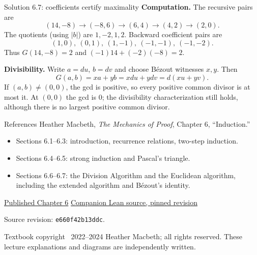 \begin{frame}{Solution 6.7: coefficients certify maximality}
\textbf{Computation.} The recursive pairs are
\[
 (14,-8)\to(-8,6)\to(6,4)\to(4,2)\to(2,0).
\]
The quotients (using $|b|$) are $1,-2,1,2$.
Backward coefficient pairs are
\[
 (1,0),\ (0,1),\ (1,-1),\ (-1,-1),\ (-1,-2).
\]
Thus $G(14,-8)=2$ and $(-1)14+(-2)(-8)=2$.

\textbf{Divisibility.} Write $a=du$, $b=dv$ and choose B\'ezout witnesses $x,y$.
Then
\[
 G(a,b)=xa+yb=xdu+ydv=d(xu+yv).
\]
If $(a,b)\ne(0,0)$, the gcd is positive, so every positive common divisor
is at most it. At $(0,0)$ the gcd is $0$; the divisibility characterization
still holds, although there is no largest positive common divisor.
\end{frame}

\begin{frame}{References}
Heather Macbeth, \emph{The Mechanics of Proof}, Chapter 6, ``Induction.''
\begin{itemize}
\item Sections 6.1--6.3: introduction, recurrence relations, two-step induction.
\item Sections 6.4--6.5: strong induction and Pascal's triangle.
\item Sections 6.6--6.7: the Division Algorithm and the Euclidean algorithm,
including the extended algorithm and B\'ezout's identity.
\end{itemize}
\href{https://hrmacbeth.github.io/math2001/06_Induction.html}{Published Chapter 6}
\qquad
\href{https://github.com/hrmacbeth/math2001/tree/e660f42b13ddcb6d12b52ba036d6bd071a0cfb9b/Math2001/06_Induction}{Companion Lean source, pinned revision}

Source revision: \texttt{e660f42b13ddc}.

Textbook copyright \textcopyright\ 2022--2024 Heather Macbeth; all rights reserved.
These lecture explanations and diagrams are independently written.
\end{frame}

